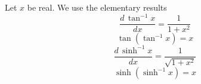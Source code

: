 \documentclass{article}
\begin{document}
Let $x$ be real. We use the elementary results
\begin{equation}
\frac{d\,\tan^{-1} x}{dx} = \frac{1}{1+x^2}
\label{eq:a1}
\end{equation}
\begin{equation}
\tan\left(\tan^{-1} x\right) = x
\label{eq:a3}
\end{equation}
\begin{equation}
\frac{d\,\sinh^{-1} x}{dx} = \frac{1}{\sqrt{1+x^2}}
\label{eq:a4}
\end{equation}
\begin{equation}
\sinh\left(\sinh^{-1} x\right) = x
\label{eq:a5}
\end{equation}
\end{document}
